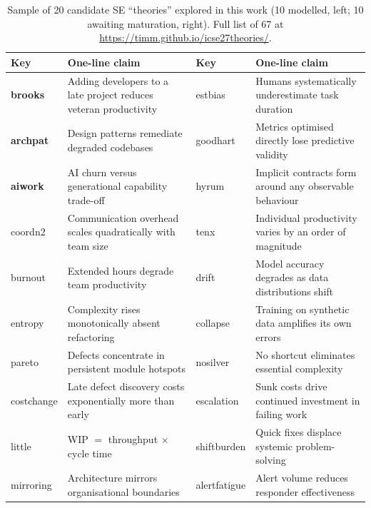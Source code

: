 \documentclass[10pt,conference]{IEEEtran}
\begin{document}
\begin{table}[t]
\caption{Sample of 20 candidate SE ``theories'' explored in this work
(10 modelled, left; 10 awaiting maturation, right). Full list of 67
at \url{https://timm.github.io/icse27theories/}.}
\label{tab:theories}
\centering
\scriptsize
\begin{tabular}{@{}lp{}@{\hspace{2em}}lp{}@{}}
\toprule
\textbf{Key} & \textbf{One-line claim} & \textbf{Key} & \textbf{One-line claim} \\
\midrule
\textbf{brooks}  & Adding developers to a late project reduces veteran productivity & estbias      & Humans systematically underestimate task duration \\
\textbf{archpat} & Design patterns remediate degraded codebases                     & goodhart     & Metrics optimised directly lose predictive validity \\
\textbf{aiwork}  & AI churn versus generational capability trade-off                & hyrum        & Implicit contracts form around any observable behaviour \\
coordn2          & Communication overhead scales quadratically with team size       & tenx         & Individual productivity varies by an order of magnitude \\
burnout          & Extended hours degrade team productivity                         & drift        & Model accuracy degrades as data distributions shift \\
entropy          & Complexity rises monotonically absent refactoring                & collapse     & Training on synthetic data amplifies its own errors \\
pareto           & Defects concentrate in persistent module hotspots                & nosilver     & No shortcut eliminates essential complexity \\
costchange       & Late defect discovery costs exponentially more than early        & escalation   & Sunk costs drive continued investment in failing work \\
little           & WIP $=$ throughput $\times$ cycle time                           & shiftburden  & Quick fixes displace systemic problem-solving \\
mirroring        & Architecture mirrors organisational boundaries                   & alertfatigue & Alert volume reduces responder effectiveness \\
\bottomrule
\end{tabular}
\end{table}
\end{document}
